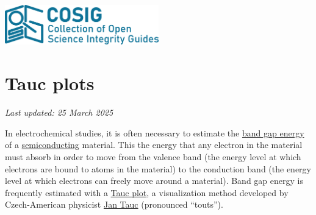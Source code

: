 \documentclass[letterpaper, 12pt]{article}
\begin{document}
\flushleft
\includegraphics[width=0.5\textwidth]{img/home/241017_final_logo_mockup.png}

\section*{Tauc plots}
\textit{Last updated: 25 March 2025}

In electrochemical studies, it is often necessary to estimate the \href{https://en.wikipedia.org/wiki/Band_gap}{band gap energy} of a \href{https://en.wikipedia.org/wiki/Semiconductor}{semiconducting} material. This the energy that any electron in the material must absorb in order to move from the valence band (the energy level at which electrons are bound to atoms in the material) to the conduction band (the energy level at which electrons can freely move around a material). Band gap energy is frequently estimated with a \href{https://en.wikipedia.org/wiki/Tauc_plot}{Tauc plot}, a visualization method developed by Czech-American physicist \href{https://en.wikipedia.org/wiki/Jan_Tauc}{Jan Tauc} (pronounced  ``touts'').
\end{document}
